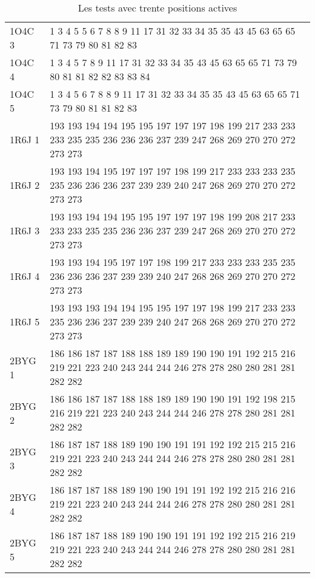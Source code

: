 \begin{table}[!htbp]
\begin{tabular}{ll}
        1O4C 3 & 1 3 4 5 5 6 7 8 8 9 11 17 31 32 33 34 35 35 43 45 63 65 65 71 73 79 80 81 82 83 \\
        1O4C 4 & 1 3 4 5 7 8 9 11 17 31 32 33 34 35 43 45 63 65 65 71 73 79 80 81 81 82 82 83 83 84 \\
        1O4C 5 & 1 3 4 5 6 7 8 8 9 11 17 31 32 33 34 35 35 43 45 63 65 65 71 73 79 80 81 81 82 83 \\
        1R6J 1 & 193 193 194 194 195 195 197 197 197 198 199 217 233 233 233 235 235 236 236 236 237 239 247 268 269 270 270 272 273 273 \\
        1R6J 2 & 193 193 194 195 197 197 197 198 199 217 233 233 233 235 235 236 236 236 237 239 239 240 247 268 269 270 270 272 273 273 \\
        1R6J 3 & 193 193 194 194 195 195 197 197 197 198 199 208 217 233 233 233 235 235 236 236 237 239 247 268 269 270 270 272 273 273 \\
        1R6J 4 & 193 193 194 195 197 197 198 199 217 233 233 233 235 235 236 236 236 237 239 239 240 247 268 268 269 270 270 272 273 273 \\
        1R6J 5 & 193 193 193 194 194 195 195 197 197 198 199 217 233 233 235 236 236 237 239 239 240 247 268 268 269 270 270 272 273 273 \\
        2BYG 1 & 186 186 187 187 188 188 189 189 190 190 191 192 215 216 219 221 223 240 243 244 244 246 278 278 280 280 281 281 282 282 \\
        2BYG 2 & 186 186 187 187 188 188 189 189 190 190 191 192 198 215 216 219 221 223 240 243 244 244 246 278 278 280 281 281 282 282 \\
        2BYG 3 & 186 187 187 188 189 190 190 191 191 192 192 215 215 216 219 221 223 240 243 244 244 246 278 278 280 280 281 281 282 282 \\
        2BYG 4 & 186 187 187 188 189 190 190 191 191 192 192 215 216 216 219 221 223 240 243 244 244 246 278 278 280 280 281 281 282 282 \\
        2BYG 5 & 186 187 187 188 189 190 190 191 191 192 192 215 216 219 219 221 223 240 243 244 244 246 278 278 280 280 281 281 282 282 \\

        \bottomrule

      \end{tabular}      
      \caption{Les tests avec trente positions actives}
\label{tab:test30}      
    \end{table}






